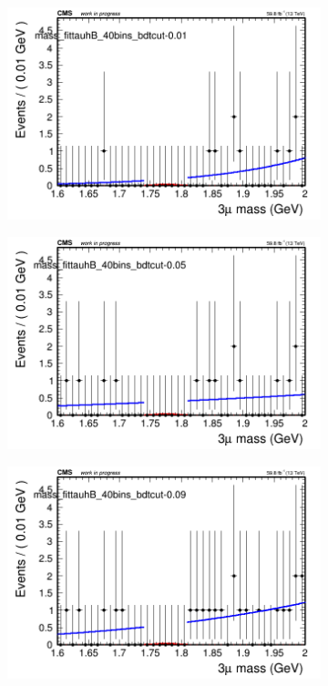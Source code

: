 \begin{figure}[H]
    \centering
    \begin{subfigure}{0.2\textwidth}
        \includegraphics[width=\textwidth]{power_law/plots/tauhB/massfit_tauhB_40bins_bdtcut-0.01.png}
        \caption{}
    \end{subfigure}
    \begin{subfigure}{0.2\textwidth}
        \includegraphics[width=\textwidth]{power_law/plots/tauhB/massfit_tauhB_40bins_bdtcut-0.05.png}
        \caption{}
    \end{subfigure}
    \begin{subfigure}{0.2\textwidth}
        \includegraphics[width=\textwidth]{power_law/plots/tauhB/massfit_tauhB_40bins_bdtcut-0.09.png}

\end{subfigure}
\end{figure}
